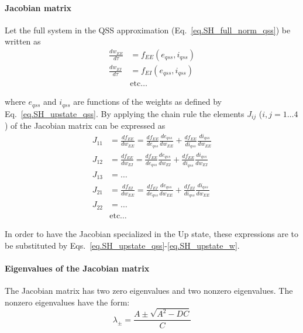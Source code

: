\documentclass[twocolumn]{article}
\newcommand{\EE}{\mathit{EE}}
\newcommand{\EI}{\mathit{EI}}
\newcommand{\qss}{\mathit{qss}}
\begin{document}
\paragraph{Jacobian matrix}

Let the full system in the QSS approximation (Eq.\ \ref{eq.SH_full_norm_qss}) be written as
\begin{displaymath}
\begin{aligned}
\frac{dw_{\EE}}{d\tau} & = f_{\EE}(e_{\qss},i_{\qss}) \\
\frac{dw_{\EI}}{d\tau} & = f_{\EI}(e_{\qss},i_{\qss}) \\
& \mbox{etc}\ldots
\end{aligned}
\end{displaymath}

\noindent where $e_{\qss}$ and $i_{\qss}$ are functions of the weights as defined by Eq.\ \ref{eq.SH_upstate_qss}. By applying the chain rule the elements $J_{ij}$ ($i,j=1\ldots4$) of the Jacobian matrix can be expressed as
\begin{displaymath}
\begin{aligned}
J_{11} & = \frac{df_{\EE}}{dw_{\EE}} = \frac{df_{\EE}}{de_{\qss}} \frac{de_{\qss}}{dw_{\EE}} + \frac{df_{\EE}}{di_{\qss}} \frac{di_{\qss}}{dw_{\EE}} \\
J_{12} & = \frac{df_{\EE}}{dw_{\EI}} = \frac{df_{\EE}}{de_{\qss}} \frac{de_{\qss}}{dw_{\EI}} + \frac{df_{\EE}}{di_{\qss}} \frac{di_{\qss}}{dw_{\EI}} \\
J_{13} & = \ldots \\
J_{21} & = \frac{df_{\EI}}{dw_{\EE}} = \frac{df_{\EI}}{de_{\qss}} \frac{de_{\qss}}{dw_{\EE}} + \frac{df_{\EI}}{di_{\qss}} \frac{di_{\qss}}{dw_{\EE}} \\
J_{22} & = \ldots \\
& \mbox{etc}\ldots
\end{aligned}
\end{displaymath}

In order to have the Jacobian specialized in the Up state, these expressions are to be substituted by Eqs.\ \ref{eq.SH_upstate_qss}-\ref{eq.SH_upstate_w}.



\paragraph{Eigenvalues of the Jacobian matrix}

The Jacobian matrix has two zero eigenvalues and two nonzero eigenvalues. The nonzero eigenvalues have the form:
\begin{equation}
\lambda_{\pm} = \frac{A \pm \sqrt{A^2 - DC}}{C}
\label{eq.SH_eigvals}
\end{equation}
\end{document}
